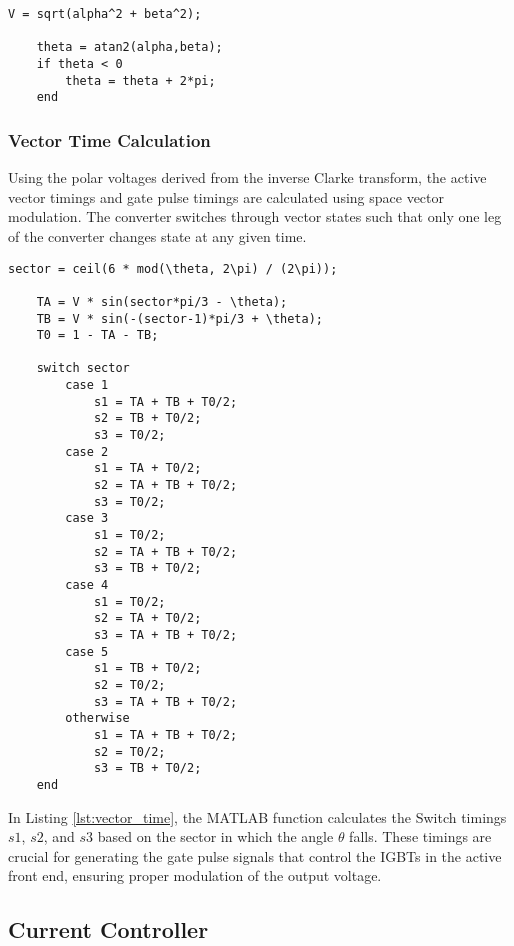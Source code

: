 \begin{lstlisting}[style=MATLAB, caption={Polar Vector Calculation}, label={lst:polar}]
    V = sqrt(alpha^2 + beta^2);
    
    theta = atan2(alpha,beta);
    if theta < 0 
        theta = theta + 2*pi;
    end
\end{lstlisting}

\subsubsection{Vector Time Calculation}
Using the polar voltages derived from the inverse Clarke transform, the active
vector timings and gate pulse timings are calculated using space vector
modulation. The converter switches through vector states such that only one leg
of the converter changes state at any given time.

\begin{lstlisting}[style=MATLAB, caption={Vector Time Calculation}, label={lst:vector_time}]
    sector = ceil(6 * mod(\theta, 2\pi) / (2\pi));

    TA = V * sin(sector*pi/3 - \theta);
    TB = V * sin(-(sector-1)*pi/3 + \theta);
    T0 = 1 - TA - TB;

    switch sector 
        case 1 
            s1 = TA + TB + T0/2; 
            s2 = TB + T0/2; 
            s3 = T0/2; 
        case 2 
            s1 = TA + T0/2; 
            s2 = TA + TB + T0/2; 
            s3 = T0/2; 
        case 3 
            s1 = T0/2; 
            s2 = TA + TB + T0/2; 
            s3 = TB + T0/2; 
        case 4 
            s1 = T0/2; 
            s2 = TA + T0/2; 
            s3 = TA + TB + T0/2; 
        case 5 
            s1 = TB + T0/2; 
            s2 = T0/2; 
            s3 = TA + TB + T0/2; 
        otherwise 
            s1 = TA + TB + T0/2; 
            s2 = T0/2; 
            s3 = TB + T0/2; 
    end
\end{lstlisting}

In Listing \ref{lst:vector_time}, the MATLAB function calculates the Switch
timings \( s1 \), \( s2 \), and \( s3 \) based on the sector in which the angle
\( \theta \) falls. These timings are crucial for generating the gate pulse
signals that control the IGBTs in the active front end, ensuring proper
modulation of the output voltage.

\subsection{Current Controller}

